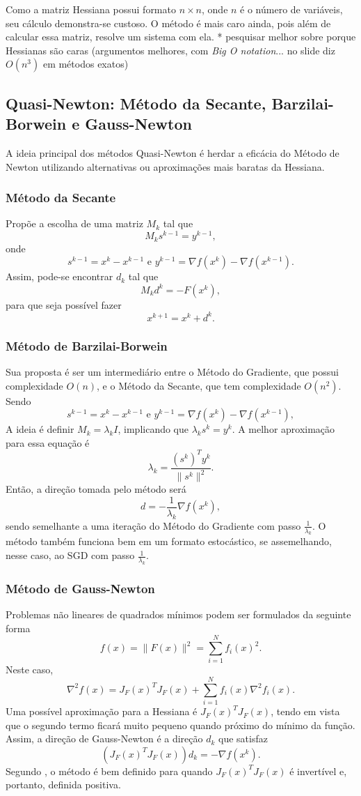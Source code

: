 \documentclass[a4paper,12pt]{article}
\begin{document}
Como a matriz Hessiana possui formato $n \times n$, onde $n$ é o número de variáveis, seu cálculo demonstra-se custoso. O método é mais caro ainda, pois além de calcular essa matriz, resolve um sistema com ela.
* pesquisar melhor sobre porque Hessianas são caras (argumentos melhores, com \textit{Big O notation}... no slide diz $O(n^3)$ em métodos exatos)

\subsection*{Quasi-Newton: Método da Secante, Barzilai-Borwein e Gauss-Newton}
A ideia principal dos métodos Quasi-Newton é herdar a eficácia do Método de Newton utilizando alternativas ou aproximações mais baratas da Hessiana.
\subsubsection*{Método da Secante}
Propõe a escolha de uma matriz $M_k$ tal que   
		$$M_k s^{k-1}= y^{k-1} ,$$
		onde $$s^{k-1}=x^k-x^{k-1} \text{ e } y^{k-1}=\nabla f(x^k)- \nabla f(x^{k-1}) .$$
Assim, pode-se encontrar $d_k$ tal que
		$$M_kd^k=-F(x^k)  ,$$
		para que seja possível fazer $$x^{k+1}=x^k+d^k .$$

\subsubsection*{Método de Barzilai-Borwein}
Sua proposta é ser um intermediário entre o Método do Gradiente, que possui complexidade $O(n)$, e o Método da Secante, que tem complexidade $O(n^2)$. Sendo 
$$s^{k-1}=x^k-x^{k-1} \text{ e } y^{k-1}=\nabla f(x^k)- \nabla f(x^{k-1}) ,$$
A ideia é definir $M_k = \lambda_k I$, implicando que $\lambda_ks^k=y^k$. A melhor aproximação para essa equação é $$\lambda_k=\frac{(s^k)^Ty^k}{\|s^k\|^2}.$$
Então, a direção tomada pelo método será $$ d = - \frac{1}{\lambda_k} \nabla f(x^k),$$
sendo semelhante a uma iteração do Método do Gradiente com passo $\frac{1}{\lambda _k}$. O método também funciona bem em um formato estocástico, se assemelhando, nesse caso, ao SGD com passo $\frac{1}{\lambda _k}$.


\subsubsection*{Método de Gauss-Newton}
Problemas não lineares de quadrados mínimos podem ser formulados da seguinte forma 
$$f(x)=\|F(x)\|^2=\sum_{i=1}^N f_i(x)^2.$$
Neste caso, $$\nabla^2 f(x)= J_F(x)^T J_F(x)+\sum_{i=1}^N f_i(x) \nabla^2 f_i(x).$$
Uma possível aproximação para a Hessiana é $J_F(x)^T J_F(x)$, tendo em vista que o segundo termo ficará muito pequeno quando próximo do mínimo da função.
Assim, a direção de Gauss-Newton é a direção $d_k$ que satisfaz $$(J_F(x)^T J_F(x)) d_k = - \nabla f(x^k).$$
Segundo \cite{artigoLevenberg}, o método é bem definido para quando $J_F(x)^T J_F(x)$ é invertível e, portanto, definida positiva. 
\end{document}
